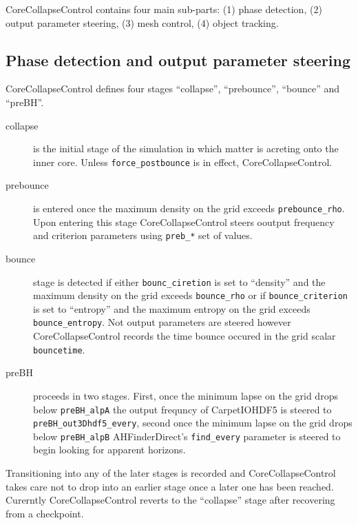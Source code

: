 CoreCollapseControl contains four main sub-parts: (1) phase detection, (2)
output parameter steering, (3) mesh control, (4) object tracking.

\subsection{Phase detection and output parameter steering}
CoreCollapseControl defines four stages ``collapse'', ``prebounce'',
``bounce'' and ``preBH''. 
\begin{description}
\item[collapse] is the initial stage of the simulation in which matter is
acreting onto the inner core. Unless \texttt{force\_postbounce} is in effect,
CoreCollapseControl.
\item[prebounce] is entered once the maximum density on the grid exceeds
\texttt{prebounce\_rho}. Upon entering this stage CoreCollapseControl steers
ooutput frequency and criterion parameters using \texttt{preb\_*} set of
values.
\item[bounce] stage is detected if either \texttt{bounc\_ciretion} is set to
``density'' and the maximum density on the grid exceeds \texttt{bounce\_rho} or
if \texttt{bounce\_criterion} is set to ``entropy'' and the maximum entropy on
the grid exceeds \texttt{bounce\_entropy}. Not output parameters are steered
however CoreCollapseControl records the time bounce occured in the grid scalar
\texttt{bouncetime}.
\item[preBH] proceeds in two stages. First, once the minimum lapse on the grid
drops below \texttt{preBH\_alpA} the output frequncy of CarpetIOHDF5 is steered
to \texttt{preBH\_out3Dhdf5\_every}, second once the minimum lapse on the grid
drops below \texttt{preBH\_alpB} AHFinderDirect's \texttt{find\_every}
parameter is steered to begin looking for apparent horizons.
\end{description}

Transitioning into any of the later stages is recorded and CoreCollapseControl
takes care not to drop into an earlier stage once a later one has been
reached. Curerntly CoreCollapseControl reverts to the ``collapse'' stage after
recovering from a checkpoint.


